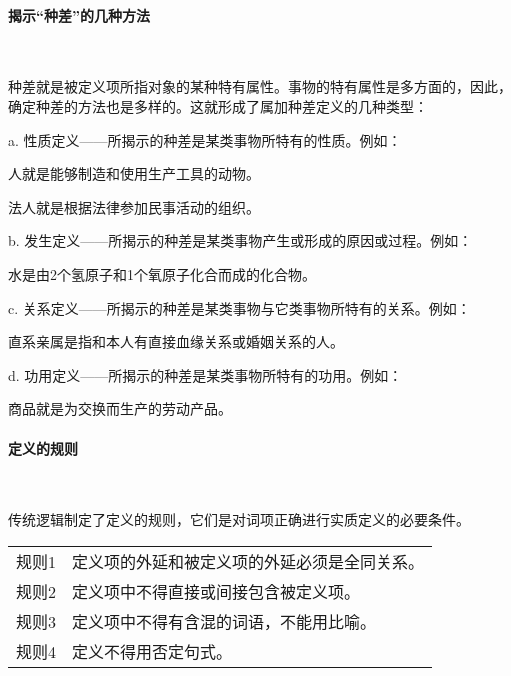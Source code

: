 \documentclass[
    a4paper,
    twoside
    ]{article}
\begin{document}
        \paragraph{
            揭示``种差''的几种方法
        }~{}
        \newline
        {
            种差就是被定义项所指对象的某种特有属性。事物的特有属性是多方面的，因此，确定种差的方法也是多样的。这就形成了属加种差定义的几种类型：

            a. 性质定义——所揭示的种差是某类事物所特有的性质。例如：

            {\fangsong{} 
                人就是能够制造和使用生产工具的动物。

                法人就是根据法律参加民事活动的组织。
            }

            b. 发生定义——所揭示的种差是某类事物产生或形成的原因或过程。例如：

            {
                \fangsong{}
                水是由2个氢原子和1个氧原子化合而成的化合物。
            }

            c. 关系定义——所揭示的种差是某类事物与它类事物所特有的关系。例如：

            {
                \fangsong{}
                直系亲属是指和本人有直接血缘关系或婚姻关系的人。
            }

            d. 功用定义——所揭示的种差是某类事物所特有的功用。例如：
            
            {
                \fangsong{}
                商品就是为交换而生产的劳动产品。
            }
        }
        \paragraph{
            定义的规则
        }~{}
        \newline
        {
            传统逻辑制定了定义的规则，它们是对词项正确进行实质定义的必要条件。

            \begin{tabular}
                {ll}
            {规则1} & {定义项的外延和被定义项的外延必须是全同关系。}\\
            {规则2} & {定义项中不得直接或间接包含被定义项。}\\
            {规则3} & {定义项中不得有含混的词语，不能用比喻。}\\
            {规则4} & {定义不得用否定句式。}

            \end{tabular}
        }
\end{document}
